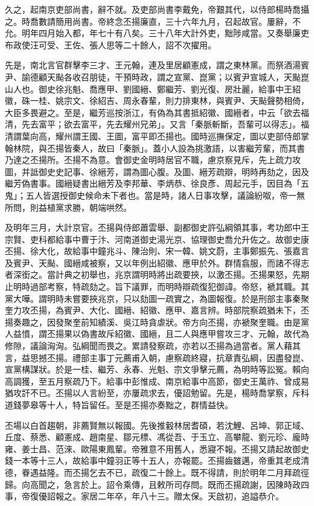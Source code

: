 \begin{pinyinscope}
久之，起南京吏部尚書，辭不就。及吏部尚書李戴免，帝艱其代，以侍郎楊時喬攝之。時喬數請簡用尚書。帝終念丕揚廉直，三十六年九月，召起故官。屢辭，不允。明年四月始入都，年七十有八矣。三十八年大計外吏，黜陟咸當。又奏舉廉吏布政使汪可受、王佐、張人思等二十餘人，詔不次擢用。

先是，南北言官群擊李三才、王元翰，連及里居顧憲成，謂之東林黨。而祭酒湯賓尹、諭德顧天颭各收召朋徒，干預時政，謂之宣黨、崑黨；以賓尹宣城人，天颭崑山人也。御史徐兆魁、喬應甲、劉國縉、鄭繼芳、劉光復、房壯麗，給事中王紹徽，硃一桂、姚宗文、徐紹吉、周永春輩，則力排東林，與賓尹、天颭聲勢相倚，大臣多畏避之。至是，繼芳巡按浙江，有偽為其書抵紹徽、國縉者，中云「欲去福清，先去富平；欲去富平，先去耀州兄弟」。又言「秦脈斬斷，吾輩可以得志」。福清謂葉向高，耀州謂王國、王圖，富平即丕揚也。國時巡撫保定，圖以吏部侍郎掌翰林院，與丕揚皆秦人，故曰「秦脈」。蓋小人設為挑激語，以害繼芳輩，而其書乃達之丕揚所。丕揚不為意。會御史金明時居官不職，慮京察見斥，先上疏力攻圖，并詆御史史記事、徐縉芳，謂為圖心腹。及圖、縉芳疏辯，明時再劾之，因及繼芳偽書事。國縉疑書出縉芳及李邦華、李炳恭、徐良彥、周起元手，因目為「五鬼」；五人皆選授御史候命未下者也。當是時，諸人日事攻擊，議論紛呶，帝一無所問，則益植黨求勝，朝端哄然。

及明年三月，大計京官。丕揚與侍郎蕭雲舉、副都御史許弘綱領其事，考功郎中王宗賢、吏科都給事中曹于汴、河南道御史湯光京、協理御史喬允升佐之。故御史康丕揚、徐大化，故給事中鐘兆斗、陳治則、宋一韓、姚文蔚，主事鄭振先、張嘉言及賓尹、天颭、國縉咸被察，又以年例出紹徽、應甲於外。群情翕服，而諸不得志者深銜之。當計典之初舉也，兆京謂明時將出疏要挾，以激丕揚。丕揚果怒，先期止明時過部考察，特疏劾之。旨下議罪，而明時辯疏復犯御諱。帝怒，褫其職。其黨大嘩。謂明時未嘗要挾兆京，只以劾圖一疏實之，為圖報復。於是刑部主事秦聚奎力攻丕揚，為賓尹、大化、國縉、紹徽、應甲、嘉言辨。時部院察疏猶未下，丕揚奏趣之，因發聚奎前知績溪、吳江時貪虐狀。帝方向丕揚，亦褫聚奎職。由是黨人益憤，謂丕揚果以偽書故斥紹徽、國縉，且二人與應甲嘗攻三才、元翰，故代為修隙，議論洶洶。弘綱聞而畏之。累請發察疏，亦若以丕揚為過當者。黨人藉其言，益思撼丕揚。禮部主事丁元薦甫入朝，慮察疏終寢，抗章責弘綱，因盡發崑、宣黨構謀狀。於是一桂、繼芳、永春、光魁、宗文爭擊元薦，為明時等訟冤。賴向高調獲，至五月察疏乃下。給事中彭惟成、南京給事中高節，御史王萬祚、曾成易猶攻訐不已。丕揚以人言紛至，亦屢疏求去，優詔勉留。先是，楊時喬掌察，斥科道錢夢皋等十人，特旨留任。至是丕揚亦奏黜之，群情益快。

丕場以白首趨朝，非薦賢無以報國。先後推轂林居耆碩，若沈鯉、呂坤、郭正域、丘度、蔡悉、顧憲成、趙南星、鄒元標、馮從吾、于玉立、高攀龍、劉元珍、龐時雍、姜士昌、范淶、歐陽東鳳輩。帝雅意不用舊人，悉寢不報。丕揚又請起故御史錢一本等十三人，故給事中鐘羽正等十五人，亦報罷。丕揚齒雖邁，帝重其老成清德，眷遇益隆。而丕揚乞去不已，疏復二十餘上。既不得請，則於明年二月拜疏徑歸。向高聞之，急言於上。詔令乘傳，且敕所司存問。既而丕揚疏謝，因陳時政四事，帝復優詔報之。家居二年卒，年八十三。贈太保。天啟初，追謚恭介。


\end{pinyinscope}
